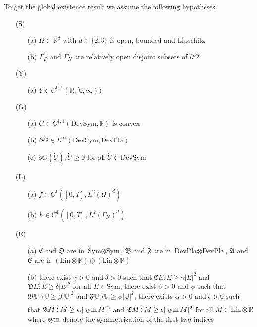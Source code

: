 To get the global existence result we assume the following hypotheses.
\begin{itemize}
\item[(S)]
\begin{itemize}[noitemsep]
\item[(a)] $\Omega\subset\mathbb{R}^d$ with $d\in\{2,3\}$ is open, bounded and Lipschitz
\item[(b)] $\Gamma_D$ and $\Gamma_N$ are relatively open disjoint subsets of $\partial\Omega$
\end{itemize}
\item[(Y)]
\begin{itemize}[noitemsep]
\item[(a)] $Y\in C^{0,1}(\mathbb{R},[0,\infty))$
\end{itemize}
\item[(G)]
\begin{itemize}[noitemsep]
\item[(a)] $G\in C^{1,1}(\text{DevSym},\mathbb{R})$ is convex
\item[(b)] $\partial G\in L^\infty(\text{DevSym},\text{DevPla})$
\item[(c)] $\partial G(\dot U):\dot U\ge0$ for all $\dot U\in\text{DevSym}$
\end{itemize}
\item[(L)]
\begin{itemize}[noitemsep]
\item[(a)] $f\in C^1([0,T],L^2(\Omega)^d)$
\item[(b)] $h\in C^1([0,T],L^2(\Gamma_N)^d)$
\end{itemize}
\item[(E)]
\begin{itemize}[noitemsep]
\item[(a)] $\mathfrak{C}$ and $\mathfrak{D}$ are in $\text{Sym}\otimes\text{Sym}$, $\mathfrak{B}$ and $\mathfrak{F}$ are in $\text{DevPla}\otimes\text{DevPla}$, $\mathfrak{A}$ and $\mathfrak{E}$ are in $(\text{Lin}\otimes\mathbb{R})\otimes(\text{Lin}\otimes\mathbb{R})$
\item[(b)] there exist $\gamma>0$ and $\delta>0$ such that $\mathfrak{C}E:E\ge\gamma|E|^2$ and $\mathfrak{D}E:E\ge\delta|E|^2$ for all $E\in\text{Sym}$, there exist $\beta>0$ and $\phi$ such that $\mathfrak{B}\mathbb{U}\circ\mathbb{U}\ge\beta|\mathbb{U}|^2$ and $\mathfrak{F}\mathbb{U}\circ\mathbb{U}\ge\phi|\mathbb{U}|^2$, there exists $\alpha>0$ and $\epsilon>0$ such that $\mathfrak{A}M\mathbin{\vdots} M\ge\alpha|\operatorname{sym} M|^2$ and $\mathfrak{E}M\mathbin{\vdots} M\ge\epsilon|\operatorname{sym} M|^2$ for all $M\in\text{Lin}\otimes\mathbb{R}$ where $\operatorname{sym}$ denote the symmetrization of the first two indices
\end{itemize}
\end{itemize}

